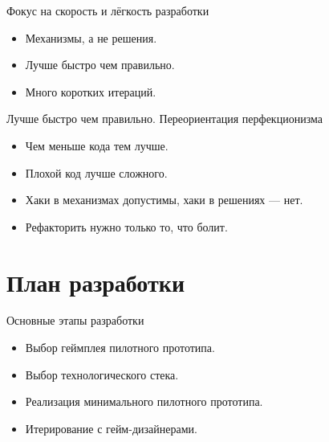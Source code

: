 \documentclass[aspectratio=169,handout,bigger]{beamer}
\begin{document}

\begin{frame}{Фокус на скорость и лёгкость разработки}
  \begin{itemize}
    \item Механизмы, а не решения.
    \item Лучше быстро чем правильно.
    \item Много коротких итераций.
  \end{itemize}
\end{frame}


\begin{frame}{Лучше быстро чем правильно. Переориентация перфекционизма}
  \begin{itemize}
    \item Чем меньше кода тем лучше.
    \item Плохой код лучше сложного.
    \item Хаки в механизмах допустимы, хаки в решениях --- нет.
    \item Рефакторить нужно только то, что болит.
  \end{itemize}
\end{frame}


\section{План разработки}


\begin{frame}{Основные этапы разработки}
  \begin{itemize}
    \item Выбор геймплея пилотного прототипа.
    \item Выбор технологического стека.
    \item Реализация минимального пилотного прототипа.
    \item Итерирование с гейм-дизайнерами.
  \end{itemize}
\end{frame}

\end{document}
